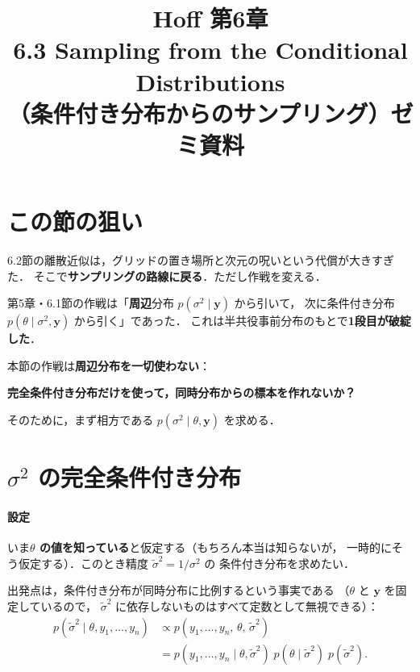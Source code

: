 \documentclass[lualatex,ja=standard,a4paper,12pt]{bxjsarticle}
\title{{\large Hoff 第6章} \\[6pt]
       \textbf{6.3\; Sampling from the Conditional Distributions} \\[4pt]
       {\normalsize （条件付き分布からのサンプリング）ゼミ資料}}
\author{}
\date{}
\begin{document}
\maketitle
\thispagestyle{empty}

\section{この節の狙い}

6.2節の離散近似は，グリッドの置き場所と次元の呪いという代償が大きすぎた．
そこで\textbf{サンプリングの路線に戻る}．ただし作戦を変える．

\medskip
第5章・6.1節の作戦は「\textbf{周辺}分布 $p(\sigma^2 \mid \boldsymbol{y})$ から引いて，
次に条件付き分布 $p(\theta \mid \sigma^2, \boldsymbol{y})$ から引く」であった．
これは半共役事前分布のもとで\textbf{1段目が破綻した}．

\medskip
本節の作戦は\textbf{周辺分布を一切使わない}：
\begin{center}
\textbf{完全条件付き分布だけを使って，同時分布からの標本を作れないか？}
\end{center}

\noindent そのために，まず相方である $p(\sigma^2 \mid \theta, \boldsymbol{y})$ を求める．

\section{$\sigma^2$ の完全条件付き分布}

\paragraph{設定}
いま\textbf{$\theta$ の値を知っている}と仮定する（もちろん本当は知らないが，
一時的にそう仮定する）．このとき精度 $\tilde{\sigma}^2 = 1/\sigma^2$ の
条件付き分布を求めたい．

\medskip
出発点は，条件付き分布が同時分布に比例するという事実である
（$\theta$ と $\boldsymbol{y}$ を固定しているので，
$\tilde{\sigma}^2$ に依存しないものはすべて定数として無視できる）：
\begin{align*}
  p(\tilde{\sigma}^2 \mid \theta, y_1, \ldots, y_n)
  &\propto p(y_1, \ldots, y_n,\, \theta,\, \tilde{\sigma}^2) \\
  &= p(y_1, \ldots, y_n \mid \theta, \tilde{\sigma}^2)\;
     p(\theta \mid \tilde{\sigma}^2)\; p(\tilde{\sigma}^2).
\end{align*}
\end{document}

